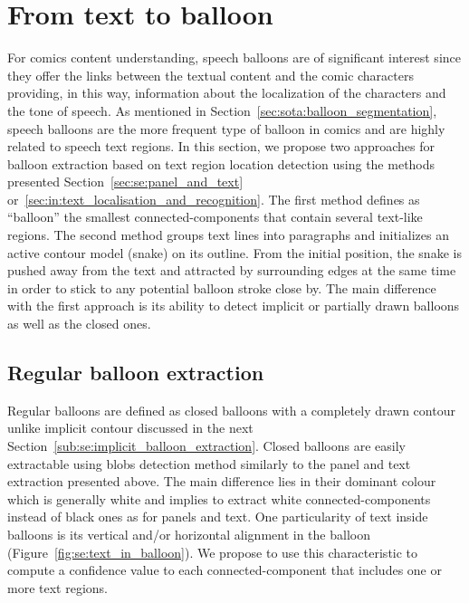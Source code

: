 


\section{From text to balloon} %
\label{sec:se:from_text_to_balloon}
For comics content understanding, speech balloons are of significant interest since they offer the links between the textual content and the comic characters providing, in this way, information about the localization of the characters and the tone of speech. 
As mentioned in Section~\ref{sec:sota:balloon_segmentation}, speech balloons are the more frequent type of balloon in comics and are highly related to speech text regions.
In this section, we propose two approaches for balloon extraction based on text region location detection using the methods presented Section~\ref{sec:se:panel_and_text} or~\ref{sec:in:text_localisation_and_recognition}.
The first method defines as ``balloon'' the smallest connected-components that contain several text-like regions.
The second method groups text lines into paragraphs and initializes an active contour model (snake) on its outline.
From the initial position, the snake is pushed away from the text and attracted by surrounding edges at the same time in order to stick to any potential balloon stroke close by.
The main difference with the first approach is its ability to detect implicit or partially drawn balloons as well as the closed ones.

\subsection{Regular balloon extraction} %
\label{sub:se:regular_balloon_extraction}
Regular balloons are defined as closed balloons with a completely drawn contour unlike implicit contour discussed in the next Section~\ref{sub:se:implicit_balloon_extraction}.
Closed balloons are easily extractable using blobs detection method similarly to the panel and text extraction presented above.
The main difference lies in their dominant colour which is generally white and implies to extract white connected-components instead of black ones as for panels and text.
One particularity of text inside balloons is its vertical and/or horizontal alignment in the balloon (Figure~\ref{fig:se:text_in_balloon}).
We propose to use this characteristic to compute a confidence value to each connected-component that includes one or more text regions.

